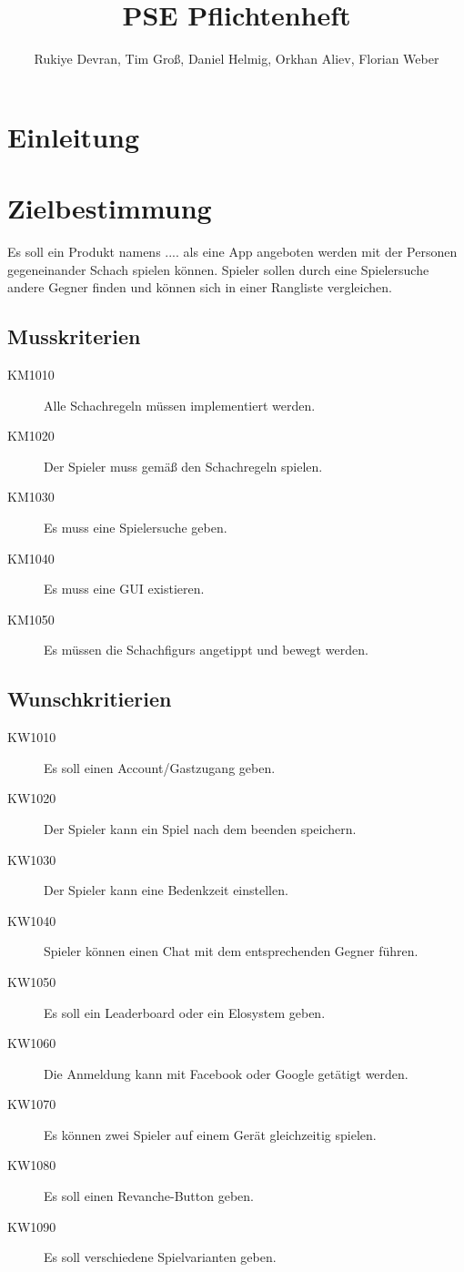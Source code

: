 \documentclass[parskip=full]{scrartcl}
\title{PSE Pflichtenheft}
\author{Rukiye Devran, Tim Groß, Daniel Helmig, Orkhan Aliev, Florian Weber}
\begin{document}
	\begin{titlepage}
	\maketitle	
	\newpage	
	\tableofcontents
	\pagebreak
	
	\end{titlepage}
\section{Einleitung}
\section{Zielbestimmung}
Es soll ein Produkt namens .... als eine App angeboten werden mit der Personen gegeneinander \gls{Schach} spielen können. Spieler sollen durch eine Spielersuche andere Gegner finden und können sich in einer Rangliste vergleichen. 
\subsection{Musskriterien}
\begin{description}
\item[KM1010] Alle \gls{Schachregeln} müssen implementiert werden.
\item[KM1020] Der \gls{Spieler} muss gemäß den \gls{Schachregeln} spielen.
\item[KM1030] Es muss eine Spielersuche geben.
\item[KM1040] Es muss eine GUI existieren.
\item[KM1050] Es müssen die \glspl{Schachfigur} angetippt und bewegt werden.
\end{description}
\subsection{Wunschkritierien}
\begin{description}
\item[KW1010] Es soll einen Account/Gastzugang geben.
\item[KW1020] Der \gls{Spieler} kann ein Spiel nach dem beenden speichern.
\item[KW1030] Der \gls{Spieler} kann eine Bedenkzeit einstellen.
\item[KW1040] \gls{Spieler} können einen Chat mit dem entsprechenden Gegner führen.
\item[KW1050] Es soll ein Leaderboard oder ein \gls{Elo}system geben.
\item[KW1060] Die Anmeldung kann mit Facebook oder Google getätigt werden.
\item[KW1070] Es können zwei \gls{Spieler} auf einem Gerät gleichzeitig spielen.
\item[KW1080] Es soll einen Revanche-Button geben.
\item[KW1090] Es soll verschiedene Spielvarianten geben.
\end{description}
\end{document}
